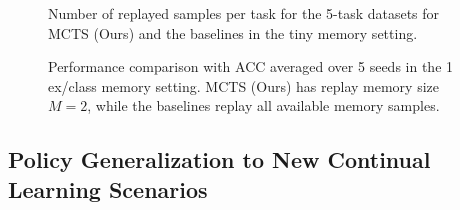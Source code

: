 \begin{figure} %
\begin{minipage}{\textwidth}
	\begin{minipage}[b]{0.38\textwidth}
		\centering
		\setlength{\figwidth}{0.96\textwidth}
		\setlength{\figheight}{.15\textheight}
		
		\vspace{-3mm}
		\caption{Number of replayed samples per task for the 5-task datasets for MCTS (Ours) and the baselines in the tiny memory setting.}
		\label{fig:tiny_memory_usage_5task_datasets}
	\end{minipage}
	\hfill
	\begin{minipage}[b]{0.6\textwidth}
		\centering
		\footnotesize
		\vspace{-3mm}
		\vspace{-3mm}
		\captionsetup{type=table, width=.94\linewidth}
		\caption{Performance comparison with ACC averaged over 5 seeds in the 1 ex/class memory setting. MCTS (Ours) has replay memory size $M=2$, while the baselines replay all available memory samples. }
		\label{tab:efficiency_of_replay_scheduling_5task_datasets}
	\end{minipage}
\end{minipage}
\vspace{-2mm}
\end{figure}



\subsection{Policy Generalization to New Continual Learning Scenarios}

